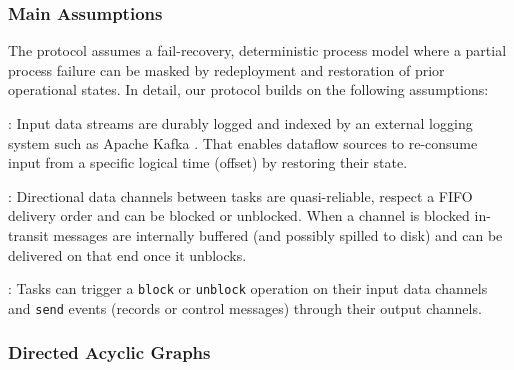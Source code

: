 \subsubsection{Main Assumptions}

The protocol assumes a fail-recovery, deterministic process model \cite{elnozahy2002survey} where a partial process failure can be masked by redeployment and restoration of prior operational states. In detail, our protocol builds on the following assumptions:

: Input data streams are durably logged and indexed by an external logging system such as Apache Kafka \cite{kreps2011kafka}. That enables dataflow sources to re-consume input from a specific logical time (offset) by restoring their state. 

: Directional data channels between tasks are quasi-reliable, respect a FIFO delivery order and can be blocked or unblocked. When a channel is blocked in-transit messages are internally buffered (and possibly spilled to disk) and can be delivered on that end once it unblocks.

: Tasks can trigger a \texttt{block} or \texttt{unblock} operation on their input data channels and \texttt{send} events (records or control messages) through their output channels.


\subsubsection{Directed Acyclic Graphs}

